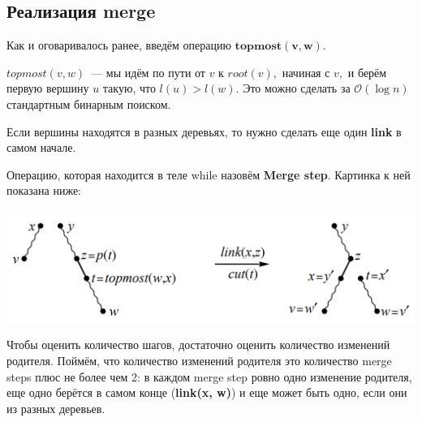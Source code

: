 \subsection{Реализация merge}
Как и оговаривалось ранее, введём операцию $\mathbf{topmost(v, w)}.$

$topmost(v,w)$~--- мы идём по пути от $v$ к $root(v),$ начиная с $v,$ и берём первую вершину $u$ такую, что $l(u) > l(w).$ Это можно сделать за $\mathcal{O}(\log{n})$ стандартным бинарным поиском.

\begin{algorithmic}[1]
            \State \Return {}
        
        \Else 
            \EndIf
            \EndIf
            \EndWhile
        \EndIf
    \EndProcedure
            
\end{algorithmic}
Если вершины находятся в разных деревьях, то нужно сделать еще один \textbf{link} в самом начале.

Операцию, которая находится в теле while назовём \textbf{Merge step}. Картинка к ней показана ниже:
\begin{center}
    \includegraphics[scale = 0.4]{img/mergestep.png}
\end{center}

Чтобы оценить количество шагов, достаточно оценить количество изменений родителя. Поймём, что количество изменений родителя это количество merge steps плюс не более чем 2: в каждом merge step ровно одно изменение родителя, еще одно берётся в самом конце (\textbf{link(x, w)}) и еще может быть одно, если они из разных деревьев.


